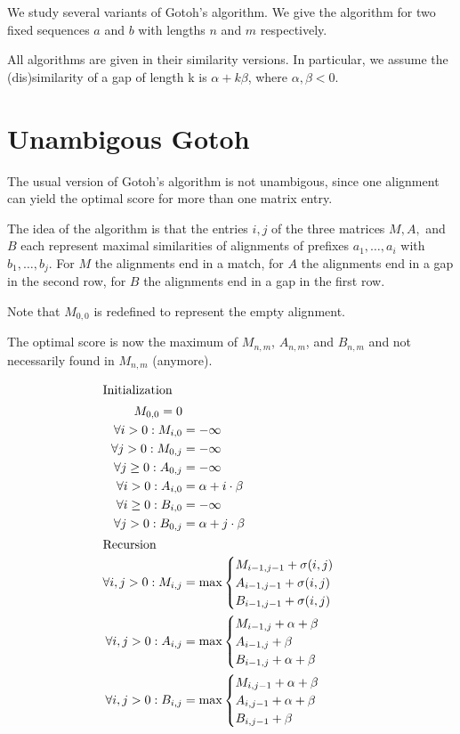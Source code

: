 \documentclass{article}
\begin{document}
We study several variants of Gotoh's algorithm. We give the algorithm for two
fixed sequences $a$ and $b$ with lengths $n$ and $m$ respectively.

All algorithms are given in their similarity versions. In particular, we
assume the (dis)similarity of a gap of length k is $\alpha+k\beta$, where
$\alpha,\beta<0$.

\section{Unambigous Gotoh}

The usual version of Gotoh's algorithm is not unambigous, since one alignment
can yield the optimal score for more than one matrix entry. 

The idea of the algorithm is that the entries $i,j$ of the three matrices
$M, A,$ and $B$ each represent maximal similarities of alignments of
prefixes $a_1,\dots,a_i$ with $b_1,\dots,b_j$. For $M$ the alignments end in
a match, for $A$ the alignments end in a gap in the second row, for $B$
the alignments end in a gap in the first row.

Note that $M_{0,0}$ is redefined to represent the empty alignment.

The optimal score is now the maximum of $M_{n,m}$, $A_{n,m}$, and $B_{n,m}$ and
not necessarily found in $M_{n,m}$ (anymore).

\begin{align*}
\intertext{Initialization}
M_{0,0} = 0\\
\forall i>0: M_{i,0} &= -\infty\\
\forall j>0: M_{0,j} &= -\infty\\
%
\forall j\geq 0: A_{0,j} &= -\infty\\
\forall i>0: A_{i,0} &= \alpha+i\cdot\beta\\
%
\forall i\geq 0: B_{i,0} &= -\infty\\
\forall j>0: B_{0,j} &= \alpha+j\cdot\beta\\
%
\intertext{Recursion}
  \forall i,j>0: M_{i,j} & = \max
  \begin{cases}
    M_{i-1,j-1} + \sigma(i,j) \\
    A_{i-1,j-1} + \sigma(i,j) \\
    B_{i-1,j-1} + \sigma(i,j) \\
  \end{cases}
\\
  \forall i,j>0: A_{i,j} & = \max
  \begin{cases}
    M_{i-1,j} + \alpha + \beta \\
    A_{i-1,j} + \beta \\
    B_{i-1,j} + \alpha + \beta \\
  \end{cases}
\\
  \forall i,j>0: B_{i,j} & = \max
  \begin{cases}
    M_{i,j-1} + \alpha + \beta \\
    A_{i,j-1} + \alpha + \beta \\
    B_{i,j-1} + \beta \\
  \end{cases}
\end{align*}
\end{document}
